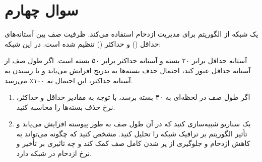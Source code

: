 \section{سوال چهارم}


یک شبکه از الگوریتم  برای مدیریت ازدحام استفاده می‌کند. ظرفیت صف بین آستانه‌های حداقل () و حداکثر () تنظیم شده است. در این شبکه:


آستانه حداقل برابر ۲۰ بسته و آستانه حداکثر برابر ۵۰ بسته است. اگر طول صف از آستانه حداقل عبور کند، احتمال حذف بسته‌ها به تدریج افزایش می‌یابد و با رسیدن به آستانه حداکثر، این احتمال به ۱۰۰٪ می‌رسد.

\begin{enumerate}
	\item 
	اگر طول صف در لحظه‌ای به ۴۰ بسته برسد، با توجه به مقادیر حداقل و حداکثر، نرخ حذف بسته‌ها را محاسبه کنید.
	
	
	\item 
	یک سناریو شبیه‌سازی کنید که در آن طول صف به طور پیوسته افزایش می‌یابد و تأثیر الگوریتم  بر ترافیک شبکه را تحلیل کنید. مشخص کنید که چگونه  می‌تواند به کاهش ازدحام و جلوگیری از پر شدن کامل صف کمک کند و چه تاثیری بر تأخیر و نرخ ازدحام در شبکه دارد.
\end{enumerate}